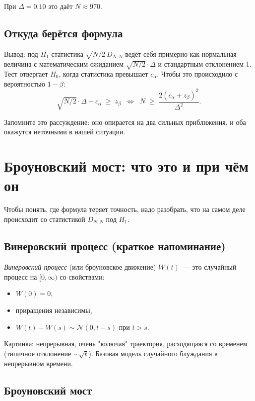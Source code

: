 \documentclass[11pt]{article}
\begin{document}
При $\Delta = 0.10$ это даёт $N \approx 970$.

\subsection{Откуда берётся формула}

Вывод: под $H_1$ статистика $\sqrt{N/2}\, D_{N,N}$ ведёт себя примерно как нормальная величина с математическим ожиданием $\sqrt{N/2}\cdot\Delta$ и стандартным отклонением 1. Тест отвергает $H_0$, когда статистика превышает $c_\alpha$. Чтобы это происходило с вероятностью $1{-}\beta$:
\[
\sqrt{N/2}\cdot\Delta - c_\alpha \;\geq\; z_\beta
\;\;\Longleftrightarrow\;\;
N \;\geq\; \frac{2(c_\alpha + z_\beta)^2}{\Delta^2}.
\]

Запомните это рассуждение: оно опирается на два сильных приближения, и оба окажутся неточными в нашей ситуации.

\section{Броуновский мост: что это и при чём он}

Чтобы понять, где формула теряет точность, надо разобрать, что на самом деле происходит со статистикой $D_{N,N}$ под $H_1$.

\subsection{Винеровский процесс (краткое напоминание)}

\emph{Винеровский процесс} (или броуновское движение) $W(t)$~--- это случайный процесс на $[0, \infty)$ со свойствами:
\begin{itemize}[leftmargin=2em, itemsep=1pt]
\item $W(0) = 0$,
\item приращения независимы,
\item $W(t) - W(s) \sim \mathcal{N}(0, t-s)$ при $t > s$.
\end{itemize}
Картинка: непрерывная, очень "колючая" траектория, расходящаяся со временем (типичное отклонение $\sim \sqrt{t}$). Базовая модель случайного блуждания в непрерывном времени.

\subsection{Броуновский мост}
\end{document}
